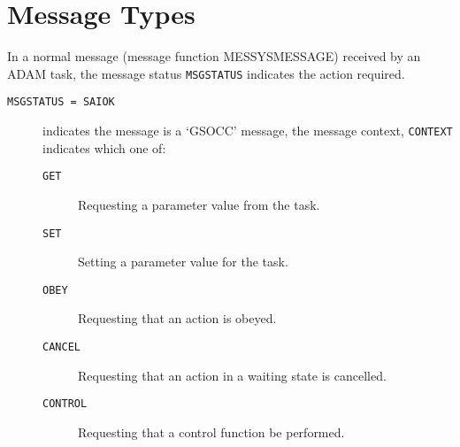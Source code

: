 \documentclass[twoside,11pt]{article}
\renewcommand{\_}{\texttt{\symbol{95}}}
\begin{document}
\section{Message Types}
In a normal message (message function MESSYS\_\_MESSAGE) received by an ADAM
task, the message status \texttt{MSGSTATUS} indicates the action required.
\begin{description}
\item[\texttt{MSGSTATUS = SAI\_\_OK}] indicates the message is a `GSOCC'
message, the message context, \texttt{CONTEXT} indicates which one of:
\begin{description}
\item[\texttt{GET}]      Requesting a parameter value from the task.
\item[\texttt{SET}]      Setting a parameter value for the task.
\item[\texttt{OBEY}]     Requesting that an action is obeyed.
\item[\texttt{CANCEL}]   Requesting that an action in a waiting state is
cancelled.
\item[\texttt{CONTROL}]  Requesting that a control function be performed.


\end{description}
\end{description}
\end{document}
